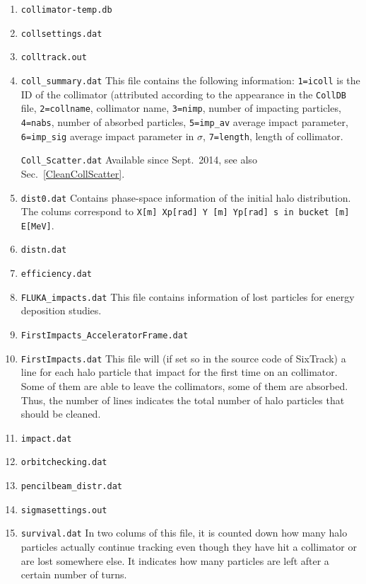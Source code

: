\documentclass[a4paper, oneside, final]{scrartcl}
\begin{document}
{{\begin{enumerate}
\item \texttt{collimator-temp.db}
\item \texttt{collsettings.dat}
\item \texttt{colltrack.out}

\item \texttt{coll\_summary.dat} This file contains the following information: \texttt{1=icoll} is the ID of the collimator (attributed according to the appearance in the \texttt{CollDB} file, \texttt{2=collname}, collimator name, \texttt{3=nimp}, number of impacting particles, \texttt{4=nabs}, number of absorbed particles, \texttt{5=imp\_av} average impact parameter, \texttt{6=imp\_sig} average impact parameter in $\sigma$, \texttt{7=length}, length of collimator.

\texttt{Coll\_Scatter.dat} Available since Sept.~2014, see also Sec.~\ref{CleanCollScatter}.
\item \texttt{dist0.dat} Contains phase-space information of the initial halo distribution. The colums correspond to \texttt{X[m]   Xp[rad]   Y [m]   Yp[rad]   s in bucket [m]  E[MeV]}.

\item \texttt{distn.dat}
\item \texttt{efficiency.dat} 

\item \texttt{FLUKA\_impacts.dat} This file contains information of lost particles for energy deposition studies. 

\item \texttt{FirstImpacts\_AcceleratorFrame.dat}
\item \texttt{FirstImpacts.dat} This file will (if set so in the source code of SixTrack) a line for each halo particle that impact for the first time on an collimator. Some of them are able to leave the collimators, some of them are absorbed. Thus, the number of lines indicates the total number of halo particles that should be cleaned.

\item \texttt{impact.dat}
\item \texttt{orbitchecking.dat}
\item \texttt{pencilbeam\_distr.dat}
\item \texttt{sigmasettings.out}
\item \texttt{survival.dat} In two colums of this file, it is counted down how many halo particles actually continue tracking even though they have hit a collimator or are lost somewhere else. It indicates how many particles are left after a certain number of turns.


\end{enumerate}}}
\end{document}
